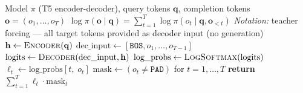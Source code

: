 \documentclass[11pt]{article}
\begin{document}
\begin{algorithm}[t]
\caption{SeqLogProb: Sequence-Level Log Probability (Encoder-Decoder)}\label{alg:seqlogprob}
\begin{algorithmic}[1]
\Require Model $\pi$ (T5 encoder-decoder), query tokens $\mathbf{q}$, completion tokens $\mathbf{o} = (o_1, \ldots, o_T)$
\Ensure $\log \pi(\mathbf{o} \mid \mathbf{q}) = \sum_{t=1}^{T} \log \pi(o_t \mid \mathbf{q}, \mathbf{o}_{<t})$
\Statex \textit{Notation:} teacher forcing --- all target tokens provided as decoder input (no generation)
\State $\mathbf{h} \gets \textsc{Encoder}(\mathbf{q})$
\State $\text{dec\_input} \gets [\texttt{BOS}, o_1, \ldots, o_{T-1}]$
\State $\text{logits} \gets \textsc{Decoder}(\text{dec\_input}, \mathbf{h})$
\State $\text{log\_probs} \gets \textsc{LogSoftmax}(\text{logits})$
    \State $\ell_t \gets \text{log\_probs}[t,\; o_t]$
\EndFor
\State $\text{mask} \gets (o_t \neq \texttt{PAD})$ for $t = 1, \ldots, T$
\State \textbf{return} $\sum_{t=1}^{T} \ell_t \cdot \text{mask}_t$
\end{algorithmic}
\end{algorithm}
\end{document}
